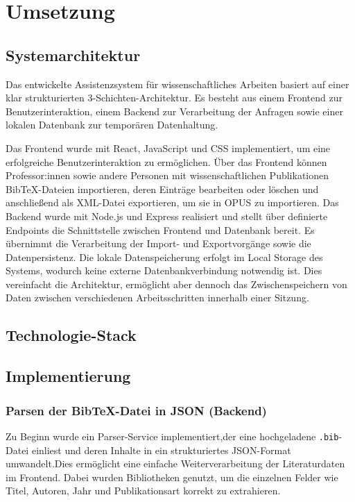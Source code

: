 \chapter{Umsetzung}

\section{Systemarchitektur}
Das entwickelte Assistenzsystem für wissenschaftliches Arbeiten basiert auf einer klar strukturierten 3-Schichten-Architektur. 
Es besteht aus einem Frontend zur Benutzerinteraktion, einem Backend zur Verarbeitung der Anfragen sowie einer lokalen Datenbank 
zur temporären Datenhaltung.

Das Frontend wurde mit React, JavaScript und CSS implementiert, um eine erfolgreiche Benutzerinteraktion zu ermöglichen. 
Über das Frontend können Professor:innen sowie andere Personen mit wissenschaftlichen Publikationen BibTeX-Dateien importieren, 
deren Einträge bearbeiten oder löschen und anschließend als XML-Datei exportieren, um sie in OPUS zu importieren. Das Backend 
wurde mit Node.js und Express realisiert und stellt über definierte Endpoints die Schnittstelle zwischen Frontend und Datenbank 
bereit. Es übernimmt die Verarbeitung der Import- und Exportvorgänge sowie die Datenpersistenz. Die lokale Datenspeicherung 
erfolgt im Local Storage des Systems, wodurch keine externe Datenbankverbindung notwendig ist. Dies vereinfacht die Architektur, 
ermöglicht aber dennoch das Zwischenspeichern von Daten zwischen verschiedenen Arbeitsschritten innerhalb einer Sitzung.

\section{Technologie-Stack}

\section{Implementierung}

\subsection{Parsen der BibTeX-Datei in JSON (Backend)}
Zu Beginn wurde ein Parser-Service implementiert,der eine hochgeladene \texttt{.bib}-Datei einliest 
und deren Inhalte in ein strukturiertes JSON-Format umwandelt.Dies ermöglicht eine einfache Weiterverarbeitung der
Literaturdaten im Frontend. Dabei wurden Bibliotheken
genutzt, um die einzelnen Felder wie Titel, Autoren, Jahr und Publikationsart korrekt zu extrahieren.

